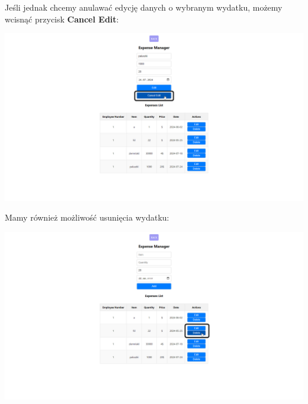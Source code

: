 \documentclass[12pt]{article}
\begin{document}
\begin{minipage}{\textwidth}
\noindent Jeśli jednak chcemy anulawać edycję danych o wybranym wydatku, możemy wcisnąć przycisk \textbf{Cancel Edit}:
\begin{center}
\includegraphics[width=\textwidth]{media/Expenses_cancelEdit.png}
\end{center}
\end{minipage}

\begin{minipage}{\textwidth}
\noindent Mamy również możliwość usunięcia wydatku:
\begin{center}
\includegraphics[width=\textwidth]{media/Expenses_delete.png}
\end{center}
\end{minipage}
\end{document}
